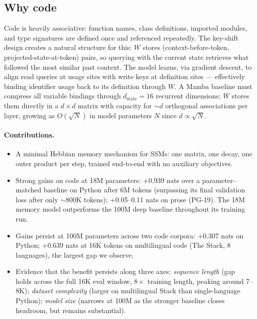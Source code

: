 \documentclass{article}
\begin{document}
\subsection*{Why code}
Code is heavily associative: function names, class definitions, imported modules, and type signatures are defined once and referenced repeatedly. The key-shift design creates a natural structure for this: $W$ stores (context-before-token, projected-state-at-token) pairs, so querying with the current state retrieves what followed the most similar past context. The model learns, via gradient descent, to align read queries at usage sites with write keys at definition sites --- effectively binding identifier usage back to its definition through $W$. A Mamba baseline must compress all variable bindings through $d_\text{state} = 16$ recurrent dimensions; $W$ stores them directly in a $d \times d$ matrix with capacity for ${\sim}d$ orthogonal associations per layer, growing as $O(\sqrt{N})$ in model parameters $N$ since $d \propto \sqrt{N}$.

\paragraph{Contributions.}
\begin{itemize}
    \item A minimal Hebbian memory mechanism for SSMs: one matrix, one decay, one outer product per step, trained end-to-end with no auxiliary objectives.
    \item Strong gains on code at 18M parameters: $+$0.939 nats over a parameter-matched baseline on Python after 6M tokens (surpassing its final validation loss after only ${\sim}$800K tokens); $+$0.05--0.11 nats on prose (PG-19). The 18M memory model outperforms the 100M deep baseline throughout its training run.
    \item Gains persist at 100M parameters across two code corpora: $+$0.307 nats on Python; $+$0.639 nats at 16K tokens on multilingual code (The Stack, 8 languages), the largest gap we observe.
    \item Evidence that the benefit persists along three axes: \emph{sequence length} (gap holds across the full 16K eval window, $8\times$ training length, peaking around 7--8K); \emph{dataset complexity} (larger on multilingual Stack than single-language Python); \emph{model size} (narrows at 100M as the stronger baseline closes headroom, but remains substantial).
\end{itemize}
\end{document}
